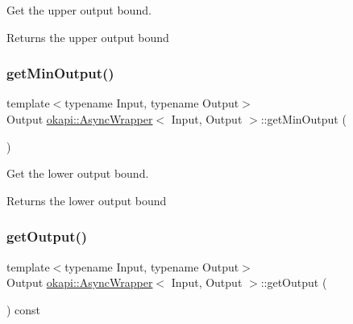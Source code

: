 Get the upper output bound.

\begin{DoxyReturn}{Returns}
the upper output bound 
\end{DoxyReturn}
\mbox{\label{classokapi_1_1AsyncWrapper_a41ccefbf1da06cca1ec525d0ad80fa00}} 
\subsubsection{\texorpdfstring{getMinOutput()}{getMinOutput()}}
{\footnotesize\ttfamily template$<$typename Input, typename Output$>$ \\
Output \mbox{\hyperlink{classokapi_1_1AsyncWrapper}{okapi\+::\+Async\+Wrapper}}$<$ Input, Output $>$\+::get\+Min\+Output (\begin{DoxyParamCaption}{ }\end{DoxyParamCaption})\hspace{0.3cm}{\ttfamily [inline]}}

Get the lower output bound.

\begin{DoxyReturn}{Returns}
the lower output bound 
\end{DoxyReturn}
\mbox{\label{classokapi_1_1AsyncWrapper_a6f3859f212f0348e73df98c83208f3c4}} 
\subsubsection{\texorpdfstring{getOutput()}{getOutput()}}
{\footnotesize\ttfamily template$<$typename Input, typename Output$>$ \\
Output \mbox{\hyperlink{classokapi_1_1AsyncWrapper}{okapi\+::\+Async\+Wrapper}}$<$ Input, Output $>$\+::get\+Output (\begin{DoxyParamCaption}{ }\end{DoxyParamCaption}) const\hspace{0.3cm}{\ttfamily [inline]}}

